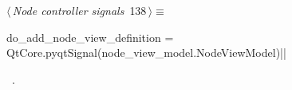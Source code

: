 \documentclass[%
    a4paper,    %
    justified,  %
    nobib,      %
    openany     %
]{tufte-book}
\begin{document}
% 
% 
% 
\begin{flushleft} \small
\begin{minipage}{\linewidth}\label{scrap152}\raggedright\small
{} $\langle\,${\itshape Node controller signals}\nobreak\ {\footnotesize {138}}$\,\rangle\equiv$
\vspace{-1ex}
\begin{pythoncode}
do_add_node_view_definition = QtCore.pyqtSignal(node_view_model.NodeViewModel)|\NWsep|
\end{pythoncode}
\vspace{1.5ex}
\footnotesize
\begin{list}{}{\setlength{\itemsep}{-\parsep}\setlength{\itemindent}{-\leftmargin}}
\item \NWtxtMacroRefIn\ .

\item{}
\end{list}
\end{minipage}\vspace{4ex}
\end{flushleft}
\end{document}
